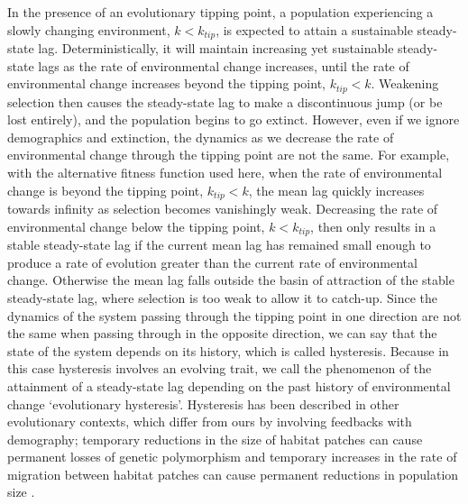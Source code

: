 \documentclass[12pt,letterpaper]{article} %
\begin{document}
In the presence of an evolutionary tipping point, a population experiencing a slowly changing environment, $k<k_{tip}$, is expected to attain a sustainable steady-state lag.
Deterministically, it will maintain increasing yet sustainable steady-state lags as the rate of environmental change increases, until the rate of environmental change increases beyond the tipping point, $k_{tip}<k$.
Weakening selection then causes the steady-state lag to make a discontinuous jump (or be lost entirely), and the population begins to go extinct.
However, even if we ignore demographics and extinction, the dynamics as we decrease the rate of environmental change through the tipping point are not the same.
For example, with the alternative fitness function used here, when the rate of environmental change is beyond the tipping point, $k_{tip}<k$, the mean lag quickly increases towards infinity as selection becomes vanishingly weak.
Decreasing the rate of environmental change below the tipping point, $k<k_{tip}$, then only results in a stable steady-state lag if the current mean lag has remained small enough to produce a rate of evolution greater than the current rate of environmental change.
Otherwise the mean lag falls outside the basin of attraction of the stable steady-state lag, where selection is too weak to allow it to catch-up. %
Since the dynamics of the system passing through the tipping point in one direction are not the same when passing through in the opposite direction, we can say that the state of the system depends on its history, which is called hysteresis.
Because in this case hysteresis involves an evolving trait, we call the phenomenon of the attainment of a steady-state lag depending on the past history of environmental change `evolutionary hysteresis'. 
Hysteresis has been described in other evolutionary contexts, which differ from ours by involving feedbacks with demography; temporary reductions in the size of habitat patches can cause permanent losses of genetic polymorphism \citep{Kisdi1999} and temporary increases in the rate of migration between habitat patches can cause permanent reductions in population size \citep{Ronce2001}.
\end{document}
